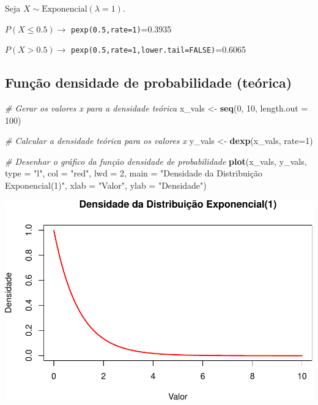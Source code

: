 \documentclass[
]{book}
\newenvironment{Shaded}{\begin{snugshade}}{\end{snugshade}}
\newcommand{\AttributeTok}[1]{\textcolor[rgb]{0.13,0.29,0.53}{#1}}
\newcommand{\CommentTok}[1]{\textcolor[rgb]{0.56,0.35,0.01}{\textit{#1}}}
\newcommand{\DecValTok}[1]{\textcolor[rgb]{0.00,0.00,0.81}{#1}}
\newcommand{\FunctionTok}[1]{\textcolor[rgb]{0.13,0.29,0.53}{\textbf{#1}}}
\newcommand{\NormalTok}[1]{#1}
\newcommand{\OtherTok}[1]{\textcolor[rgb]{0.56,0.35,0.01}{#1}}
\newcommand{\StringTok}[1]{\textcolor[rgb]{0.31,0.60,0.02}{#1}}
\begin{document}
Seja \(X\sim \text{Exponencial}(\lambda=1)\).

\(P(X\leq 0.5) \to\) \texttt{pexp(0.5,rate=1)}=0.3935

\(P(X > 0.5) \to\) \texttt{pexp(0.5,rate=1,lower.tail=FALSE)}=0.6065

\subsection{Função densidade de probabilidade (teórica)}\label{funuxe7uxe3o-densidade-de-probabilidade-teuxf3rica}

\begin{Shaded}
\begin{Highlighting}[]
\CommentTok{\# Gerar os valores x para a densidade teórica}
\NormalTok{x\_vals }\OtherTok{\textless{}{-}} \FunctionTok{seq}\NormalTok{(}\DecValTok{0}\NormalTok{, }\DecValTok{10}\NormalTok{, }\AttributeTok{length.out =} \DecValTok{100}\NormalTok{)}

\CommentTok{\# Calcular a densidade teórica para os valores x}
\NormalTok{y\_vals }\OtherTok{\textless{}{-}} \FunctionTok{dexp}\NormalTok{(x\_vals, }\AttributeTok{rate=}\DecValTok{1}\NormalTok{)}

\CommentTok{\# Desenhar o gráfico da função densidade de probabilidade}
\FunctionTok{plot}\NormalTok{(x\_vals, y\_vals, }\AttributeTok{type =} \StringTok{"l"}\NormalTok{, }
     \AttributeTok{col =} \StringTok{"red"}\NormalTok{, }\AttributeTok{lwd =} \DecValTok{2}\NormalTok{, }
     \AttributeTok{main =} \StringTok{"Densidade da Distribuição Exponencial(1)"}\NormalTok{,}
     \AttributeTok{xlab =} \StringTok{"Valor"}\NormalTok{, }\AttributeTok{ylab =} \StringTok{"Densidade"}\NormalTok{)}
\end{Highlighting}
\end{Shaded}

\includegraphics{introR_files/figure-latex/unnamed-chunk-265-1.pdf}
\end{document}
